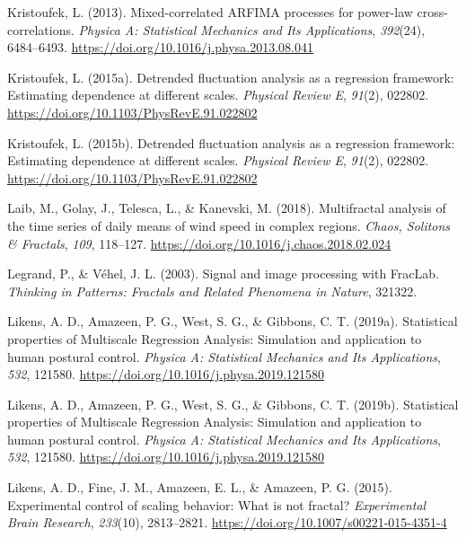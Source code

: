 \documentclass[
  man]{apa6}
\newlength{\cslhangindent}
\newlength{\cslentryspacingunit} %
\newenvironment{CSLReferences}[2] %
 {%
  \setlength{\parindent}{0pt}
  \ifodd #1
  \let\oldpar\par
  \def\par{\hangindent=\cslhangindent\oldpar}
  \fi
  \setlength{\parskip}{#2\cslentryspacingunit}
 }%
 {}
\begin{document}
\begin{CSLReferences}{1}{0}
\leavevmode{}%
Kristoufek, L. (2013). Mixed-correlated {ARFIMA} processes for power-law cross-correlations. \emph{Physica A: Statistical Mechanics and Its Applications}, \emph{392}(24), 6484--6493. \url{https://doi.org/10.1016/j.physa.2013.08.041}

\leavevmode{}%
Kristoufek, L. (2015a). Detrended fluctuation analysis as a regression framework: {Estimating} dependence at different scales. \emph{Physical Review E}, \emph{91}(2), 022802. \url{https://doi.org/10.1103/PhysRevE.91.022802}

\leavevmode{}%
Kristoufek, L. (2015b). Detrended fluctuation analysis as a regression framework: Estimating dependence at different scales. \emph{Physical Review E}, \emph{91}(2), 022802. \url{https://doi.org/10.1103/PhysRevE.91.022802}

\leavevmode{}%
Laib, M., Golay, J., Telesca, L., \& Kanevski, M. (2018). Multifractal analysis of the time series of daily means of wind speed in complex regions. \emph{Chaos, Solitons \& Fractals}, \emph{109}, 118--127. \url{https://doi.org/10.1016/j.chaos.2018.02.024}

\leavevmode{}%
Legrand, P., \& Véhel, J. L. (2003). Signal and image processing with FracLab. \emph{Thinking in Patterns: Fractals and Related Phenomena in Nature}, 321322.

\leavevmode{}%
Likens, A. D., Amazeen, P. G., West, S. G., \& Gibbons, C. T. (2019a). Statistical properties of {Multiscale} {Regression} {Analysis}: {Simulation} and application to human postural control. \emph{Physica A: Statistical Mechanics and Its Applications}, \emph{532}, 121580. \url{https://doi.org/10.1016/j.physa.2019.121580}

\leavevmode{}%
Likens, A. D., Amazeen, P. G., West, S. G., \& Gibbons, C. T. (2019b). Statistical properties of Multiscale Regression Analysis: Simulation and application to human postural control. \emph{Physica A: Statistical Mechanics and Its Applications}, \emph{532}, 121580. \url{https://doi.org/10.1016/j.physa.2019.121580}

\leavevmode{}%
Likens, A. D., Fine, J. M., Amazeen, E. L., \& Amazeen, P. G. (2015). Experimental control of scaling behavior: What is not fractal? \emph{Experimental Brain Research}, \emph{233}(10), 2813--2821. \url{https://doi.org/10.1007/s00221-015-4351-4}


\end{CSLReferences}
\end{document}
